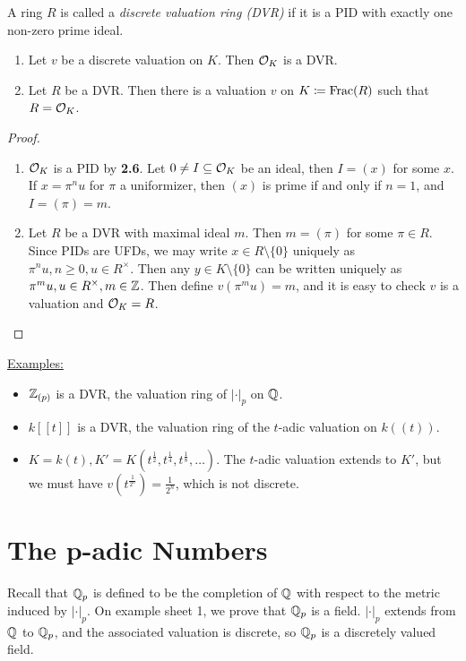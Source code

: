 \documentclass[10pt,a4paper]{article}
\begin{document}
\begin{definition}
  A ring $R$ is called a \emph{discrete valuation ring (DVR)} if it is a PID with exactly one non-zero prime ideal.
\end{definition}
\begin{lemma}\hspace*{0cm}
  \begin{enumerate}
    \item Let $v$ be a discrete valuation on $K$. Then $\mathcal{O}_K$ is a DVR.
    \item Let $R$ be a DVR. Then there is a valuation $v$ on $K \coloneqq \operatorname{Frac}(R)$ such that $R = \mathcal{O}_K$.
  \end{enumerate}
\end{lemma}
\begin{proof}\hspace*{0cm}
  \begin{enumerate}
    \item $\mathcal{O}_K$ is a PID by \textbf{2.6}. Let $0 \neq I \subseteq \mathcal{O}_K$ be an ideal, then $I = (x)$ for some $x$. If $x = \pi^nu$ for $\pi$ a uniformizer, then $(x)$ is prime if and only if $n = 1$, and $I = (\pi) = m$.

    \item Let $R$ be a DVR with maximal ideal $m$. Then $m = (\pi)$ for some $\pi \in R$. Since PIDs are UFDs, we may write $x \in R\setminus\{0\}$ uniquely as $\pi^n u, n\geq0, u \in R^\times$. Then any $y \in K\setminus\{0\}$ can be written uniquely as $\pi^m u, u \in R^\times, m \in \mathbb{Z}$. Then define $v(\pi^m u) = m$, and it is easy to check $v$ is a valuation and $\mathcal{O}_K = R$.
  \end{enumerate}
\end{proof}

\underline{Examples:}
\begin{itemize}
  \item $\mathbb{Z}_{(p)}$ is a DVR, the valuation ring of $|\cdot|_p$ on $\mathbb{Q}$.
  \item $k[[t]]$ is a DVR, the valuation ring of the $t$-adic valuation on $k((t))$.
  \item $K = k(t), K' = K\left(t^{\frac12}, t^{\frac14}, t^{\frac18}, \ldots\right)$. The $t$-adic valuation extends to $K'$, but we must have $v(t^{\frac{1}{2^n}}) = \frac{1}{2^n}$, which is not discrete.
\end{itemize}

\section{The p-adic Numbers}
Recall that $\mathbb{Q}_p$ is defined to be the completion of $\mathbb{Q}$ with respect to the metric induced by $|\cdot|_p$. On example sheet 1, we prove that $\mathbb{Q}_p$ is a field. $|\cdot|_p$ extends from $\mathbb{Q}$ to $\mathbb{Q}_p$, and the associated valuation is discrete, so $\mathbb{Q}_p$ is a discretely valued field.
\end{document}
